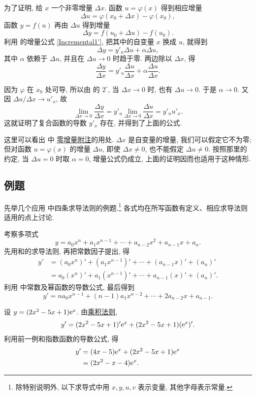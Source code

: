 为了证明, 给 $x$ 一个非零增量 $\Delta x$.
函数 $u=\varphi(x)$ 得到相应增量
$$
\Delta u=\varphi(x_0+\Delta x)-\varphi(x_0),
$$
函数 $y=f(u)$ 再由 $\Delta u$ 得到增量
$$
\Delta y=f(u_0+\Delta u)-f(u_0).
$$
利用  的增量公式 \eqref{Incremental1'},
把其中的自变量 $x$ 换成 $u$, 就得到
$$
\Delta y=y'_u\Delta u+\alpha\Delta u,
$$
其中 $\alpha$ 依赖于 $\Delta u$, 并且在 $\Delta u\to0$ 时趋于零.
两边除以 $\Delta x$, 得
$$
\frac{\Delta y}{\Delta x}
=y'_u\frac{\Delta u}{\Delta x}
+\alpha\frac{\Delta u}{\Delta x}.
$$

因为 $\varphi$ 在 $x_0$ 处可导, 所以由  的
\hyperref[prop:differentiability_implies_continuity]{$2^\circ$},
当 $\Delta x\to0$ 时, 也有 $\Delta u\to0$.
于是 $\alpha\to0$.
又因 $\Delta u/\Delta x\to u'_x$, 故
$$
\lim_{\Delta x\to0}\frac{\Delta y}{\Delta x}
=y'_u\lim_{\Delta x\to0}\frac{\Delta u}{\Delta x}
=y'_u u'_x.
$$
这就证明了复合函数的导数 $y'_x$ 存在, 并得到了上面的公式.

\begin{remark}\label{note:chain_rule_zero_inner_increment}
这里可以看出  中
\hyperref[note:increment_parameter_at_zero]{零增量附注}的用处.
$\Delta x$ 是自变量的增量, 我们可以假定它不为零;
但对函数 $u=\varphi(x)$ 的增量 $\Delta u$,
即使 $\Delta x\ne0$, 也不能假定 $\Delta u\ne0$.
按照那里的约定, 当 $\Delta u=0$ 时取 $\alpha=0$,
增量公式仍成立, 上面的证明因而也适用于这种情形.
\end{remark}

\subsection{例题}\label{subsec:99}
先举几个应用  中四条求导法则的例题.\footnote{除特别说明外,
以下求导式中用 $x,y,u,v$ 表示变量, 其他字母表示常量.}
各式均在所写函数有定义、相应求导法则适用的点上讨论.

\label{ex:differentiate_polynomial}
考察多项式
$$
y=a_0x^n+a_1x^{n-1}+\cdots+a_{n-2}x^2+a_{n-1}x+a_n.
$$
先用和的求导法则, 再把常数因子提出, 得
\begin{align*}
y'&=(a_0x^n)'+(a_1x^{n-1})'+\cdots+(a_{n-1}x)'+(a_n)'\\
&=a_0(x^n)'+a_1(x^{n-1})'+\cdots+a_{n-1}(x)'+(a_n)'.
\end{align*}
利用  中常数及幂函数的导数公式, 最后得到
$$
y'=na_0x^{n-1}+(n-1)a_1x^{n-2}+\cdots+2a_{n-2}x+a_{n-1}.
$$

\label{ex:differentiate_polynomial_exponential}
设 $y=(2x^2-5x+1)\mathrm{e}^x$.
由\hyperref[rule:derivative_product]{乘积法则},
$$
y'=(2x^2-5x+1)'\mathrm{e}^x+(2x^2-5x+1)(\mathrm{e}^x)'.
$$
利用前一例和指数函数的导数公式, 得
\begin{align*}
y'&=(4x-5)\mathrm{e}^x+(2x^2-5x+1)\mathrm{e}^x\\
&=(2x^2-x-4)\mathrm{e}^x.
\end{align*}

